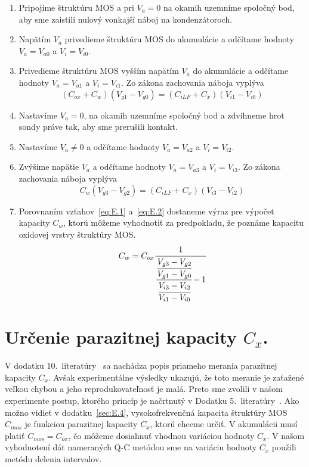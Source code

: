 \begin{enumerate}

\item Pripojíme štruktúru MOS a pri $V_a = 0$ na okamih uzemníme
  spoločný bod, aby sme zaistili nulový vonkajší náboj na
  kondenzátoroch.

\item Napätím $V_a$ privedieme štruktúru MOS do akumulácie a odčítame
  hodnoty $V_a = V_{a0}$ a $V_i = V_{i0}$.

\item Privedieme štruktúru MOS vyšším napätím $V_a$ do akumulácie a
  odčítame hodnoty $V_a = V_{a1}$ a $V_i = V_{i1}$. Zo zákona zachovania
  náboja vyplýva
  \begin{equation}\label{eq:E.1}
    (C_{ox} + C_w)(V_{g1} - V_{g0}) = (C_{iLF} + C_x)(V_{i1} - V_{i0})
  \end{equation}

\item Nastavíme $V_a=0$, na okamih uzemníme spoločný bod a zdvihneme
  hrot sondy práve tak, aby sme prerušili kontakt.

\item Nastavíme $V_a \neq 0$ a odčítame hodnoty $V_a = V_{a2}$ a $V_i =  V_{i2}$.

\item Zvýšime napätie $V_a$ a odčítame hodnoty $V_a = V_{a3}$ a $V_i =  V_{i3}$. Zo zákona zachovania náboja vyplýva
  \begin{equation}\label{eq:E.2}
    C_w (V_{g3} - V_{g2}) = (C_{iLF} + C_x)(V_{i3} - V_{i2})
  \end{equation}

\item Porovnaním vzťahov~\ref{eq:E.1} a~\ref{eq:E.2} dostaneme výraz
  pre výpočet kapacity $C_w$, ktorú môžeme vyhodnotiť za predpokladu,
  že poznáme kapacitu oxidovej vrstvy štruktúry MOS\@.
  \begin{equation}\label{eq:E.3}
    C_w = C_{ox} \cfrac{1} {\cfrac {\cfrac{V_{g3}-V_{g2}}{V_{g1}-V_{g0}}} {\cfrac{V_{i3}-V_{i2}}{V_{i1}-V_{i0}}} -1}
  \end{equation}

\end{enumerate}


\section{Určenie parazitnej kapacity $C_x$.}\label{sec:E.2}

V dodatku 10.\ literatúry~\cite{App.4} sa nachádza popis priameho
merania parazitnej kapacity $C_x$. Avšak experimentálne výsledky
ukazujú, že toto meranie je zaťažené veľkou chybou a jeho
reprodukovateľnosť je malá. Preto sme zvolili v našom experimente
postup, ktorého princíp je načrtnutý v Dodatku
5.\ literatúry~\cite{App.4}. Ako možno vidieť v dodatku~\ref{sec:E.4},
vysokofrekvenčná kapacita štruktúry MOS $C_{mos}$ je funkciou
parazitnej kapacity $C_x$, ktorú chceme určiť. V akumulácii musí
platiť $C_{mos} = C_{ox}$, čo môžeme dosiahnuť vhodnou variáciou
hodnoty $C_x$. V našom vyhodnotení dát nameraných Q-C metódou sme na
variáciu hodnoty $C_x$ použili metódu delenia intervalov.


